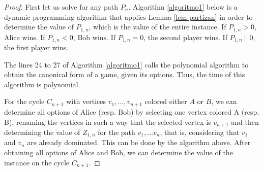 \documentclass[12pt]{article}
\begin{document}
\begin{proof}
First let us solve for any path $P_n$. 
Algorithm \ref{algoritmo1} below is a dynamic programming algorithm that applies Lemma \ref{lem-partizan} in order to determine the value of $P_{1,n}$, which is the value of the entire instance. If $P_{1,n}>0$, Alice wins. If $P_{1,n}<0$, Bob wins. If $P_{1,n}=0$, the second player wins. If $P_{1,n}\ ||\ 0$, the first player wins.


The lines 24 to 27 of Algorithm \ref{algoritmo1} calls the polynomial algorithm to obtain the canonical form of a game, given its options.
Thus, the time of this algorithm is polynomial.

For the cycle $C_{n+1}$ with vertices $v_1,\ldots,v_{n+1}$ colored either $A$ or $B$, we can determine all options of Alice (resp. Bob) by selecting one vertex colored A (resp. B), renaming the vertices in such a way that the selected vertex is $v_{n+1}$ and then determining the value of $Z_{1,n}$ for the path $v_1,\ldots v_n$, that is, considering that $v_1$ and $v_n$ are already dominated. This can be done by the algorithm above.
After obtaining all options of Alice and Bob, we can determine the value of the instance on the cycle $C_{n+1}$.

\end{proof}
\end{document}

